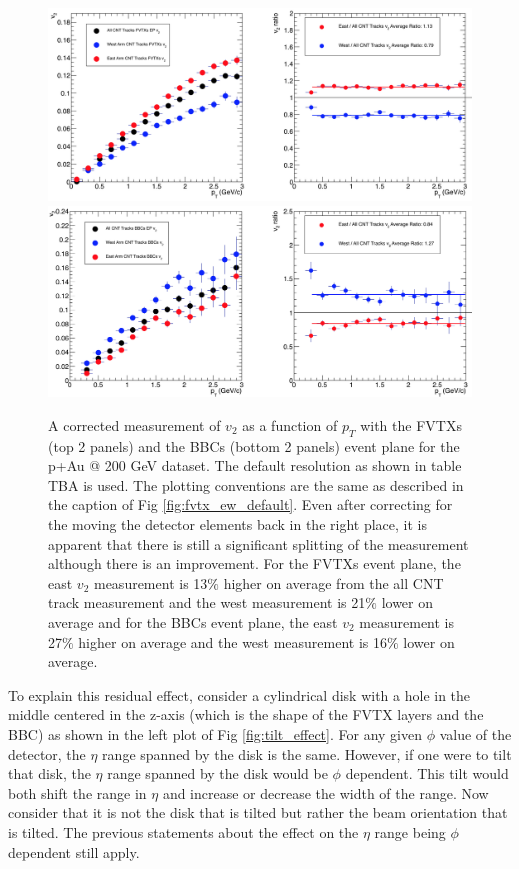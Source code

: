 \begin{figure}[!h]
\begin{center}
\includegraphics[width=0.85\linewidth]{figs/fvtx_vertex_rot_only.png}
\includegraphics[width=0.85\linewidth]{figs/bbc_vertex_rot_only.png}
\caption{A corrected measurement of $v_{2}$ as a function of $p_T$ with the FVTXs (top 2 panels) and the BBCs (bottom 2 panels) event plane for the p+Au @ 200 GeV dataset. The default resolution as shown in table TBA is used. The plotting conventions are the same as described in the caption of Fig \ref{fig:fvtx_ew_default}. Even after correcting for the moving the detector elements back in the right place, it is apparent that there is still a significant splitting of the measurement although there is an improvement. For the FVTXs event plane, the east $v_2$ measurement is 13$\%$ higher on average from the all CNT track measurement and the west measurement is 21$\%$ lower on average and for the BBCs event plane, the east $v_2$ measurement is 27$\%$ higher on average and the west measurement is 16$\%$ lower on average.}
\label{fig:fvtx_ew_rot}
\end{center}
\end{figure}


To explain this residual effect, consider a cylindrical disk with a hole in the middle centered in the z-axis (which is the shape of the FVTX layers and the BBC) as shown in the left plot of Fig \ref{fig:tilt_effect}. For any given $\phi$ value of the detector, the $\eta$ range spanned by the disk is the same. However, if one were to tilt that disk, the $\eta$ range spanned by the disk would be $\phi$ dependent. This tilt would both shift the range in $\eta$ and increase or decrease the width of the range. Now consider that it is not the disk that is tilted but rather the beam orientation that is tilted. The previous statements about the effect on the $\eta$ range being $\phi$ dependent still apply. 


